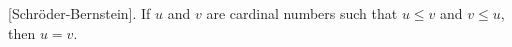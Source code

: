 [Schröder-Bernstein]. If $u$ and $v$ are cardinal numbers such that $u \leq v$ and $v \leq u$, then $u = v$.